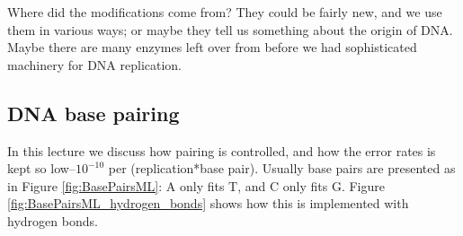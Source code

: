 \documentclass[]{article}
\begin{document}
Where did the modifications come from? They could be fairly new, and we use them in various ways; or maybe they tell us something about the origin of DNA. Maybe there are many enzymes left over from before we had sophisticated machinery for DNA replication.

\subsection{DNA base pairing}\label{section:DNAasInfo2}

In this lecture we discuss how pairing is controlled, and how the error rates is kept so low--$10^{-10}$ per (replication*base pair). Usually base pairs are presented as in Figure \ref{fig:BasePairsML}: A only fits T, and C only fits G. Figure \ref{fig:BasePairsML_hydrogen_bonds} shows how this is implemented with hydrogen bonds.
\end{document}
